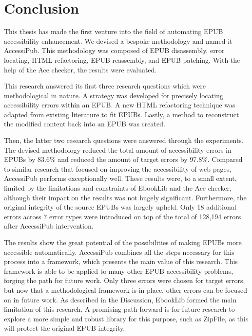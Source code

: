 \section{Conclusion}
\label{sec:conclusion}
This thesis has made the first venture into the field of automating EPUB accessibility enhancement. We devised a bespoke methodology and named it AccessiPub. This methodology was composed of EPUB disassembly, error locating, HTML refactoring, EPUB reassembly, and EPUB patching. With the help of the Ace checker, the results were evaluated. 

This research answered its first three research questions which were methodological in nature. A strategy was developed for precisely locating accessibility errors within an EPUB. A new HTML refactoring technique was adapted from existing literature to fit EPUBs. Lastly, a method to reconstruct the modified content back into an EPUB was created. 

Then, the latter two research questions were answered through the experiments. The devised methodology reduced the total amount of accessibility errors in EPUBs by 83.6\% and reduced the amount of target errors by 97.8\%. Compared to similar research that focused on improving the accessibility of web pages, AccessiPub performs exceptionally well. These results were, to a small extent, limited by the limitations and constraints of EbookLib and the Ace checker, although their impact on the results was not hugely significant. Furthermore, the original integrity of the source EPUBs was largely upheld. Only 18 additional errors across 7 error types were introduced on top of the total of 128,194 errors after AccessiPub intervention. 

The results show the great potential of the possibilities of making EPUBs more accessible automatically. AccessiPub combines all the steps necessary for this process into a framework, which presents the main value of this research. This framework is able to be applied to many other EPUB accessibility problems, forging the path for future work. Only three errors were chosen for target errors, but now that a methodological framework is in place, other errors can be focused on in future work. As described in the Discussion, EbookLib formed the main limitation of this research. A promising path forward is for future research to explore a more simple and robust library for this purpose, such as ZipFile, as this will protect the original EPUB integrity.